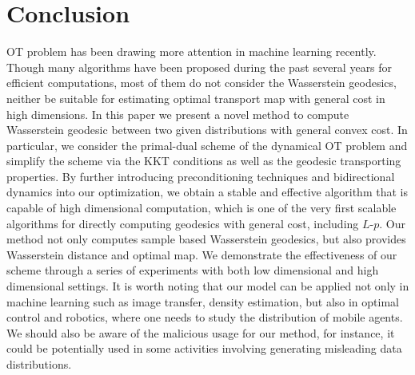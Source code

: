 \documentclass{article}
\newcommand{\chen}[1]{\textcolor{cyan}{#1}}
\begin{document}
\section{Conclusion}
OT problem has been drawing more attention in machine learning recently. Though many algorithms have been proposed during the past several years for efficient computations, most of them do not consider the Wasserstein geodesics, neither be suitable for estimating optimal transport map with general cost in high dimensions. In this paper we present a novel method to compute Wasserstein geodesic between two given distributions with general convex cost. In particular, we consider the primal-dual scheme of the dynamical OT problem and simplify the scheme via the KKT conditions as well as the geodesic transporting properties. By further introducing preconditioning techniques and bidirectional dynamics into our optimization, we obtain a stable and effective algorithm that is capable of high dimensional computation, which is one of the very first scalable algorithms for directly computing geodesics with general cost, including $L$-$p$. Our method not only computes sample based Wasserstein geodesics, but also provides Wasserstein distance and optimal map. We demonstrate the effectiveness of our scheme through a series of experiments with both low dimensional and high dimensional settings. It is worth noting that our model can be applied not only in machine learning such as image transfer, density estimation, but also in optimal control and robotics, where one needs to study the distribution of mobile agents. We should also be aware of the malicious usage for our method, for instance, it could be potentially used in some activities involving generating misleading data distributions.



\end{document}
